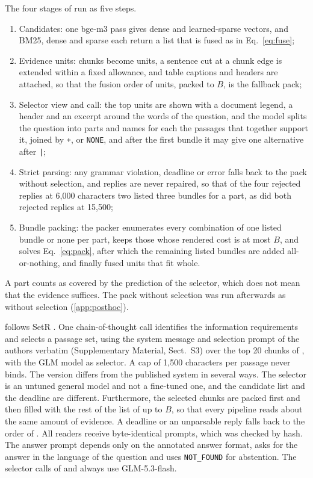 The four stages of \lexb{} run as five steps.
\begin{enumerate}
  \item Candidates: one bge-m3 pass gives dense and learned-sparse vectors, and BM25, dense and sparse each return a list that is fused as in Eq.~\ref{eq:fuse};
  \item Evidence units: chunks become units, a sentence cut at a chunk edge is extended within a fixed allowance, and table captions and headers are attached, so that the fusion order of units, packed to $B$, is the fallback pack;
  \item Selector view and call: the top units are shown with a document legend, a header and an excerpt around the words of the question, and the model splits the question into parts and names for each the passages that together support it, joined by \texttt{+}, or \texttt{NONE}, and after the first bundle it may give one alternative after \texttt{|};
  \item Strict parsing: any grammar violation, deadline or error falls back to the pack without selection, and replies are never repaired, so that of the four rejected replies at 6,000 characters two listed three bundles for a part, as did both rejected replies at 15,500;
  \item Bundle packing: the packer enumerates every combination of one listed bundle or none per part, keeps those whose rendered cost is at most $B$, and solves Eq.~\ref{eq:pack}, after which the remaining listed bundles are added all-or-nothing, and finally fused units that fit whole.
\end{enumerate}
A part counts as covered by the prediction of the selector, which does not mean that the evidence suffices.
The pack without selection was run afterwards as \lexb{} without selection (\ref{app:posthoc}).

\setr{} follows SetR \citep{lee2025setr}.
One chain-of-thought call identifies the information requirements and selects a passage set, using the system message and selection prompt of the authors verbatim (Supplementary Material, Sect.~S3) over the top 20 chunks of \hybrid{}, with the GLM model as selector.
A cap of 1,500 characters per passage never binds.
The version differs from the published system in several ways.
The selector is an untuned general model and not a fine-tuned one, and the candidate list and the deadline are different. Furthermore, the selected chunks are packed first and then filled with the rest of the list of \hybrid{} up to $B$, so that every pipeline reads about the same amount of evidence.
A deadline or an unparsable reply falls back to the order of \hybrid{}.
All readers receive byte-identical prompts, which was checked by hash.
The answer prompt depends only on the annotated answer format, asks for the answer in the language of the question and uses \texttt{NOT\_FOUND} for abstention.
The selector calls of \lexb{} and \setr{} always use GLM-5.3-flash.

